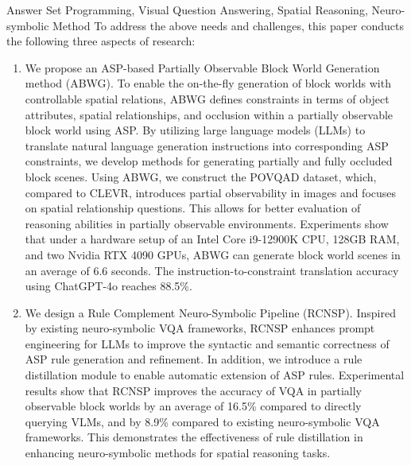 \begin{englishabstract}{Answer Set Programming, Visual Question Answering, Spatial Reasoning, Neuro-symbolic Method}
To address the above needs and challenges, this paper conducts the following three aspects of research:
\begin{enumerate}[nosep]
\item We propose an ASP-based Partially Observable Block World Generation method (ABWG). To enable the on-the-fly generation of block worlds with controllable spatial relations, ABWG defines constraints in terms of object attributes, spatial relationships, and occlusion within a partially observable block world using ASP. By utilizing large language models (LLMs) to translate natural language generation instructions into corresponding ASP constraints, we develop methods for generating partially and fully occluded block scenes. Using ABWG, we construct the POVQAD dataset, which, compared to CLEVR, introduces partial observability in images and focuses on spatial relationship questions. This allows for better evaluation of reasoning abilities in partially observable environments. Experiments show that under a hardware setup of an Intel Core i9-12900K CPU, 128GB RAM, and two Nvidia RTX 4090 GPUs, ABWG can generate block world scenes in an average of 6.6 seconds. The instruction-to-constraint translation accuracy using ChatGPT-4o reaches 88.5\%.

\item We design a Rule Complement Neuro-Symbolic Pipeline (RCNSP). Inspired by existing neuro-symbolic VQA frameworks, RCNSP enhances prompt engineering for LLMs to improve the syntactic and semantic correctness of ASP rule generation and refinement. In addition, we introduce a rule distillation module to enable automatic extension of ASP rules. Experimental results show that RCNSP improves the accuracy of VQA in partially observable block worlds by an average of 16.5\% compared to directly querying VLMs, and by 8.9\% compared to existing neuro-symbolic VQA frameworks. This demonstrates the effectiveness of rule distillation in enhancing neuro-symbolic methods for spatial reasoning tasks.


\end{enumerate}
\end{englishabstract}
